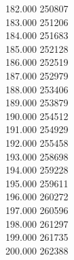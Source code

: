 { 182.000	250807 \\
 183.000	251206 \\
 184.000	251683 \\
 185.000	252128 \\
 186.000	252519 \\
 187.000	252979 \\
 188.000	253406 \\
 189.000	253879 \\
 190.000	254512 \\
 191.000	254929 \\
 192.000	255458 \\
 193.000	258698 \\
 194.000	259228 \\
 195.000	259611 \\
 196.000	260272 \\
 197.000	260596 \\
 198.000	261297 \\
 199.000	261735 \\
 200.000	262388 \\
}
